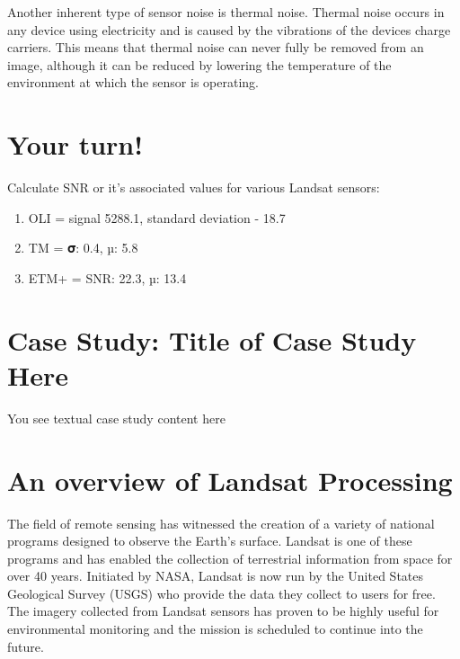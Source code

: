 \documentclass[
]{book}
\begin{document}
Another inherent type of sensor noise is thermal noise. Thermal noise
occurs in any device using electricity and is caused by the vibrations
of the devices charge carriers. This means that thermal noise can never
fully be removed from an image, although it can be reduced by lowering
the temperature of the environment at which the sensor is operating.

\hypertarget{your-turn-9}{%
\section*{Your turn!}\label{your-turn-9}}

Calculate SNR or it's associated values for various Landsat sensors:

\begin{enumerate}
\def\labelenumi{\arabic{enumi}.}
\item
  OLI = signal 5288.1, standard deviation - 18.7
\item
  TM = 𝛔: 0.4, µ: 5.8
\item
  ETM+ = SNR: 22.3, µ: 13.4
\end{enumerate}

\hypertarget{case-study-title-of-case-study-here-8}{%
\section{Case Study: Title of Case Study Here}\label{case-study-title-of-case-study-here-8}}

You see textual case study content here

\hypertarget{an-overview-of-landsat-processing}{%
\section*{An overview of Landsat Processing}\label{an-overview-of-landsat-processing}}

The field of remote sensing has witnessed the creation of a variety of
national programs designed to observe the Earth's surface. Landsat is
one of these programs and has enabled the collection of terrestrial
information from space for over 40 years. Initiated by NASA, Landsat is
now run by the United States Geological Survey (USGS) who provide the
data they collect to users for free. The imagery collected from Landsat
sensors has proven to be highly useful for environmental monitoring and
the mission is scheduled to continue into the future.
\end{document}
